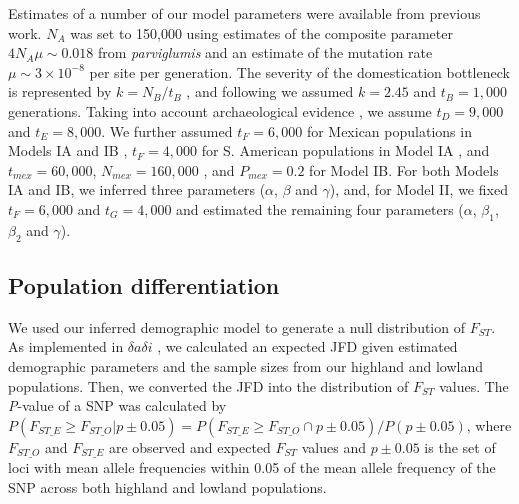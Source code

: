 Estimates of a number of our model parameters were available from previous work.    
$N_A$ was set to 150,000 using estimates of the composite parameter $4N_A\mu \sim 0.018$ from \emph{parviglumis}  \cite[]{Eyre-Walker_1998_9539756,Tenaillon_2001_11470895,Tenaillon_2004_15014173,Wright_2005_15919994,Ross-Ibarra_2009_19153259} and an estimate of the mutation rate $\mu \sim 3\times 10^{-8}$ \cite[]{Clark_2005_16079248} per site per generation.  
The severity of the domestication bottleneck is represented by $k=N_B/t_B$ \cite[]{Eyre-Walker_1998_9539756,Wright_2005_15919994}, and following \cite{Wright_2005_15919994} we assumed $k=2.45$ and $t_B=1,000$ generations.  
Taking into account archaeological evidence \cite[]{Piperno_2009_19307570}, we assume $t_D=9,000$ and $t_E=8,000$.  
We further assumed $t_F=6,000$ for Mexican populations in Models IA and IB \cite[]{Piperno_2006_69}, $t_F=4,000$ for S. American populations in Model IA \cite[]{Perry_2006_16511492,Grobman_2012_22307642}, and $t_{mex}=60,000$, $N_{mex}=160,000$ \cite[]{Ross-Ibarra_2009_19153259}, and $P_{mex}=0.2$ \cite[]{vanHeerwaarden_2011_21189301} for Model IB. 
For both Models IA and IB, we inferred three parameters ($\alpha$, $\beta$ and $\gamma$), and, for Model II, we fixed $t_F=6,000$ and $t_G=4,000$ \cite[]{Piperno_2006_69,Perry_2006_16511492,Grobman_2012_22307642}  and estimated the remaining four parameters ($\alpha$, $\beta_1$, $\beta_2$ and $\gamma$).

\subsection*{Population differentiation}
We used our inferred demographic model to generate a null distribution of $F_{ST}$.
As implemented in $\delta a \delta i$ \cite[]{Gutenkunst_2009_19851460}, we calculated an expected JFD given estimated demographic parameters and the sample sizes from our highland and lowland populations.
Then, we converted the JFD into the distribution of $F_{ST}$ values.
The \emph{P}-value of a SNP was calculated by $P(F_{ST\_E}\geq F_{ST\_O}|p\pm 0.05) = P(F_{ST\_E}\geq F_{ST\_O} \cap p\pm 0.05)/P(p\pm 0.05)$, 
where $F_{ST\_O}$ and $F_{ST\_E}$ are observed and expected $F_{ST}$ values and $p\pm 0.05$ is the set of loci with mean allele frequencies within 0.05 of the mean allele frequency of the SNP across both highland and lowland populations.

